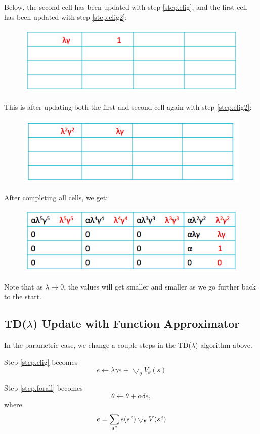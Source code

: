 \documentclass[11pt]{article}
\numberwithin{equation}{section}
\numberwithin{figure}{section}
\begin{document}
Below, the second cell has been updated with step \ref{step.elig}, and the first cell has been updated with step \ref{step.elig2}:
\clearpage
\begin{figure}[h]
	\centering
	\includegraphics[width=.4\columnwidth]{./images/fig7}
	\label{fig.fig7}
\end{figure}

This is after updating both the first and second cell again with step \ref{step.elig2}:
\begin{figure}[h!]
	\centering
	\includegraphics[width=.4\columnwidth]{./images/fig8}
	\label{fig.fig8}
\end{figure}

After completing all cells, we get:
\begin{figure}[h!]
	\centering
	\includegraphics[width=.4\columnwidth]{./images/figFinal}
	\label{fig.figFinal}
\end{figure}

Note that as $\lambda \rightarrow 0$, the values will get smaller and smaller as we go further back to the start.

\subsection*{TD($\lambda$) Update with Function Approximator}
In the parametric case, we change a couple steps in the TD($\lambda$) algorithm above.

Step \ref{step.elig} becomes
\begin{equation}
	e \leftarrow \lambda \gamma e + \bigtriangledown_\theta V_\theta(s)
\end{equation}

Step \ref{step.forall} becomes
\begin{equation}
	\theta \leftarrow \theta + \alpha \delta e,
\end{equation}
where
\begin{equation}
	e = \sum_{s"} e(s") \bigtriangledown_\theta V(s") 
\end{equation}
\end{document}

